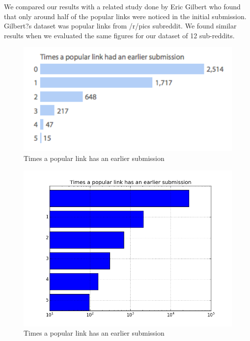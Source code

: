 \documentclass{article} %
\begin{document}
We compared our results with a related study done by Eric Gilbert who found that only around half of the popular links were noticed in the initial submission. Gilbert?s dataset was popular links from /r/pics subreddit. We found similar results when we evaluated the same figures for our dataset of 12 sub-reddits.

\begin{figure}[h]
\begin{center}
\includegraphics[width=5in]{eric.png}
\caption{Times a popular link has an earlier submission}
\end{center}
\end{figure}

\begin{figure}[h]
\begin{center}
\includegraphics[width=5in]{count.png}
\caption{Times a popular link has an earlier submission}
\end{center}
\end{figure}
\end{document}
